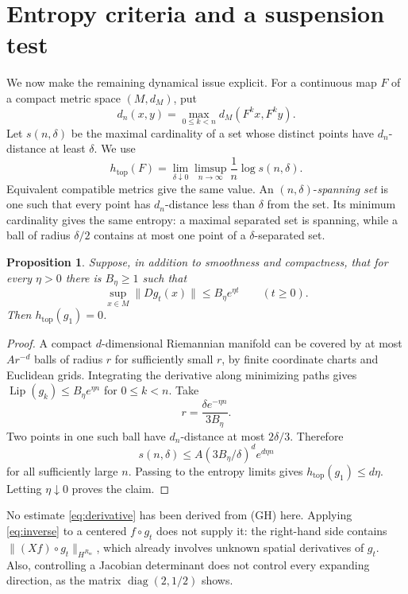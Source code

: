 \documentclass[11pt]{article}
\newtheorem{proposition}[theorem]{Proposition}
\theoremstyle{definition}
\theoremstyle{remark}
\newcommand{\htop}{h_{\mathrm{top}}}
\DeclareMathOperator{\Lip}{Lip}
\begin{document}
\section{Entropy criteria and a suspension test}
\label{sec:entropy}

We now make the remaining dynamical issue explicit. For a continuous map $F$ of a compact metric space $(M,d_M)$, put
\[
 d_n(x,y)=\max_{0\le k<n}d_M(F^kx,F^ky).
\]
Let $s(n,\delta)$ be the maximal cardinality of a set whose distinct points have $d_n$-distance at least $\delta$. We use
\[
 \htop(F)=\lim_{\delta\downarrow0}\limsup_{n\to\infty}
          \frac1n\log s(n,\delta).
\]
Equivalent compatible metrics give the same value. An $(n,\delta)$-\emph{spanning set} is one such that every point has $d_n$-distance less than $\delta$ from the set. Its minimum cardinality gives the same entropy: a maximal separated set is spanning, while a ball of radius $\delta/2$ contains at most one point of a $\delta$-separated set.

\begin{proposition}\label{prop:entropy}
Suppose, in addition to smoothness and compactness, that for every $\eta>0$ there is $B_\eta\ge1$ such that
\begin{equation}\label{eq:derivative}
 \sup_{x\in M}\|Dg_t(x)\|\le B_\eta e^{\eta t}\qquad(t\ge0).
\end{equation}
Then $\htop(g_1)=0$.
\end{proposition}
\begin{proof}
A compact $d$-dimensional Riemannian manifold can be covered by at most $Ar^{-d}$ balls of radius $r$ for sufficiently small $r$, by finite coordinate charts and Euclidean grids. Integrating the derivative along minimizing paths gives
$\Lip(g_k)\le B_\eta e^{\eta n}$ for $0\le k<n$. Take
\[
 r=\frac{\delta e^{-\eta n}}{3B_\eta}.
\]
Two points in one such ball have $d_n$-distance at most $2\delta/3$. Therefore
\[
 s(n,\delta)\le A(3B_\eta/\delta)^d e^{d\eta n}
\]
for all sufficiently large $n$. Passing to the entropy limits gives $\htop(g_1)\le d\eta$. Letting $\eta\downarrow0$ proves the claim.
\end{proof}

No estimate \eqref{eq:derivative} has been derived from (GH) here. Applying \eqref{eq:inverse} to a centered $f\circ g_t$ does not supply it: the right-hand side contains $\|(Xf)\circ g_t\|_{H^{R_m}}$, which already involves unknown spatial derivatives of $g_t$. Also, controlling a Jacobian determinant does not control every expanding direction, as the matrix $\operatorname{diag}(2,1/2)$ shows.
\end{document}
